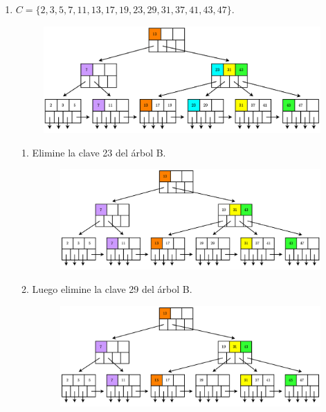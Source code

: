 \documentclass{templateNote}
\begin{document}
\begin{itemize}
\begin{enumerate}
        \newpage
        \item $C = \{2,3,5,7,11,13,17,19,23,29,31,37,41,43,47\}$.
        \begin{figure}[H]
            \centering
            \includegraphics[width=\textwidth]{diagram/P3-2.png}
        \end{figure}
        \begin{enumerate}
            \renewcommand{\labelenumi}{\alph{enumi})}
            \item Elimine la clave 23 del árbol B.
            \begin{figure}[H]
                \centering
                \includegraphics[width=\textwidth]{diagram/P3-2-a.png}
            \end{figure}

            \item Luego elimine la clave 29 del árbol B.
            \begin{figure}[H]
                \centering
                \includegraphics[width=\textwidth]{diagram/P3-2-b.png}
            \end{figure}


\end{enumerate}
\end{enumerate}
\end{itemize}
\end{document}
